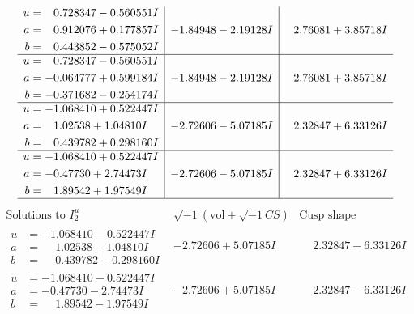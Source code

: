 \documentclass[1p]{elsarticle_modified}
\theoremstyle{definition}
\newcommand{\I}{\sqrt{-1}}
\begin{document}
$$\begin{array}{c|c|c}
\begin{aligned}
u &= \phantom{-}0.728347 - 0.560551 I \\
a &= \phantom{-}0.912076 + 0.177857 I \\
b &= \phantom{-}0.443852 - 0.575052 I\end{aligned}
 & -1.84948 - 2.19128 I & \phantom{-}2.76081 + 3.85718 I \\ \hline\begin{aligned}
u &= \phantom{-}0.728347 - 0.560551 I \\
a &= -0.064777 + 0.599184 I \\
b &= -0.371682 - 0.254174 I\end{aligned}
 & -1.84948 - 2.19128 I & \phantom{-}2.76081 + 3.85718 I \\ \hline\begin{aligned}
u &= -1.068410 + 0.522447 I \\
a &= \phantom{-}1.02538 + 1.04810 I \\
b &= \phantom{-}0.439782 + 0.298160 I\end{aligned}
 & -2.72606 - 5.07185 I & \phantom{-}2.32847 + 6.33126 I \\ \hline\begin{aligned}
u &= -1.068410 + 0.522447 I \\
a &= -0.47730 + 2.74473 I \\
b &= \phantom{-}1.89542 + 1.97549 I\end{aligned}
 & -2.72606 - 5.07185 I & \phantom{-}2.32847 + 6.33126 I\\
 \hline 
 \end{array}$$\newpage$$\begin{array}{c|c|c}  
\text{Solutions to }I^u_{2}& \I (\text{vol} + \sqrt{-1}CS) & \text{Cusp shape}\\
 \hline 
\begin{aligned}
u &= -1.068410 - 0.522447 I \\
a &= \phantom{-}1.02538 - 1.04810 I \\
b &= \phantom{-}0.439782 - 0.298160 I\end{aligned}
 & -2.72606 + 5.07185 I & \phantom{-}2.32847 - 6.33126 I \\ \hline\begin{aligned}
u &= -1.068410 - 0.522447 I \\
a &= -0.47730 - 2.74473 I \\
b &= \phantom{-}1.89542 - 1.97549 I\end{aligned}
 & -2.72606 + 5.07185 I & \phantom{-}2.32847 - 6.33126 I \\ \hline\begin{aligned}

\end{aligned}
\end{array}$$
\end{document}
